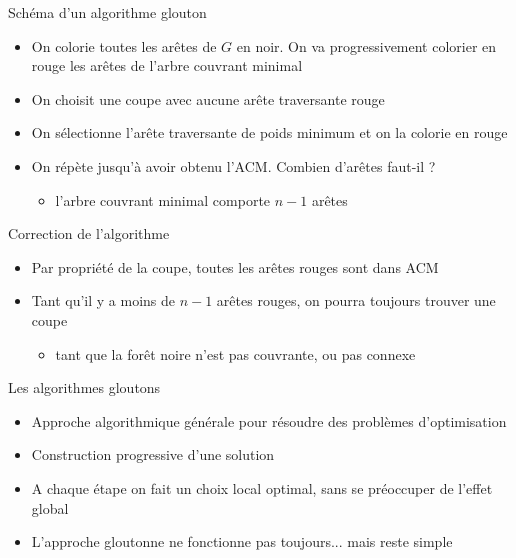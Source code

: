 \begin{frame}{Schéma d'un algorithme glouton}
    \begin{itemize}
        \item On colorie toutes les arêtes de $G$ en noir. On va progressivement colorier en rouge les arêtes de l'arbre couvrant minimal 
        \item On choisit une coupe avec aucune arête traversante rouge 
        \item On sélectionne l'arête traversante de poids minimum et on la colorie en rouge 
        \item On répète jusqu'à avoir obtenu l'ACM. Combien d'arêtes faut-il ? 
        \begin{itemize}
            \item l'arbre couvrant minimal comporte $n-1$ arêtes 
        \end{itemize}
    \end{itemize}
\end{frame}

\begin{frame}{Correction de l'algorithme}
    \begin{itemize}
        \item Par propriété de la coupe, toutes les arêtes rouges sont dans ACM 
        \item Tant qu'il y a moins de $n-1$ arêtes rouges, on pourra toujours trouver une coupe 
        \begin{itemize}
            \item tant que la forêt noire n'est pas couvrante, ou pas connexe 
        \end{itemize}
    \end{itemize}
\end{frame}


\begin{frame}{Les algorithmes gloutons}
    \begin{itemize}
        \item Approche algorithmique générale pour résoudre des problèmes d'optimisation 
        \item Construction progressive d'une solution 
        \item A chaque étape on fait un choix local optimal, sans se préoccuper de l'effet global
        \item L'approche gloutonne ne fonctionne pas toujours... mais reste simple 
    \end{itemize}
\end{frame}



